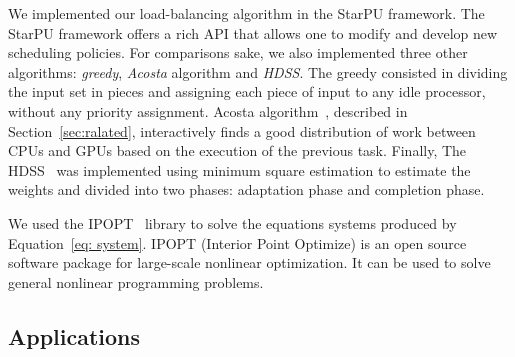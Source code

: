 \documentclass[journal]{IEEEtran}
\begin{document}


%
%

We implemented our load-balancing algorithm in the StarPU framework. The StarPU
framework offers a rich API that allows one to modify and develop new scheduling
policies. For comparisons sake, we also implemented three other algorithms:
\emph{greedy}, \emph{Acosta} algorithm and \emph{HDSS}. The greedy consisted in
dividing the input set in pieces and assigning each piece of input to any idle
processor, without any priority assignment. Acosta algorithm~\cite{acosta},
described in Section~\ref{sec:ralated}, interactively finds a good distribution
of work between CPUs and GPUs based on the execution of the previous task.
Finally, The HDSS~\cite{HDSS} was implemented using minimum square estimation to
estimate the weights and divided into two phases: adaptation phase and
completion phase.

We used the IPOPT~\cite{point} library to solve the equations systems produced
by Equation~\ref{eq: system}. IPOPT (Interior Point Optimize) is an open source
software package for large-scale nonlinear optimization. It can be used to solve
general nonlinear programming problems.

\subsection{Applications}
\end{document}
